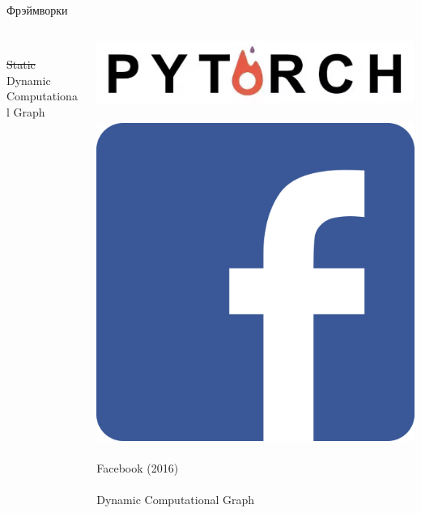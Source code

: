 \documentclass[notes,12pt, aspectratio=169]{beamer}
\begin{document}
\begin{frame}{Фрэймворки}
\begin{columns}[T]
\begin{column}{.33\textwidth}
		\mbox{ } \\
		\sout{Static}  Dynamic Computational Graph 
	\end{column}%
	\hfill%
	\begin{column}{.33\textwidth}
		\centering 	\includegraphics[width=.7\linewidth]{pytorch.png} \\
		\mbox{ } \\
		\centering 	\includegraphics[width=.3\linewidth]{facebook.png} \\
		\mbox{ } \\
		Facebook (2016) \\ 
		\mbox{ } \\
		Dynamic Computational Graph 
	\end{column}%
\end{columns}
\end{frame}
\end{document}
